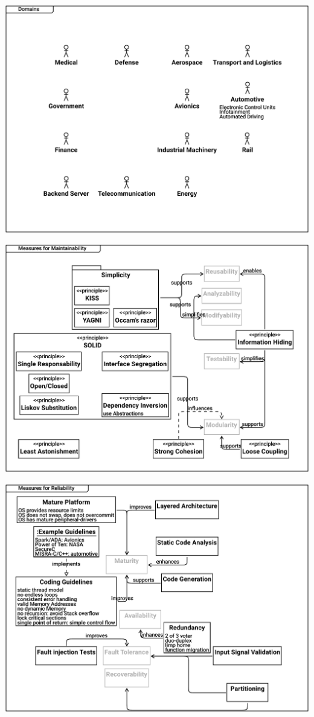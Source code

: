 \documentclass{article}
\begin{document}
\includegraphics[width= 1.0\linewidth]{quality_export/D0005_Domains.pdf}


\includegraphics[width= 1.0\linewidth]{quality_export/D0007_Measures_for_Maintainability.pdf}


\includegraphics[width= 1.0\linewidth]{quality_export/D0008_Measures_for_Reliability.pdf}

\end{document}
